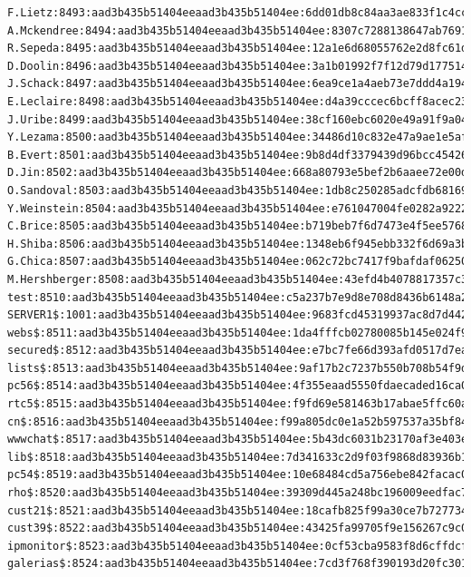 \documentclass[12pt,a4paper]{article}
\begin{document}
\begin{appendices}
\begin{lstlisting}
F.Lietz:8493:aad3b435b51404eeaad3b435b51404ee:6dd01db8c84aa3ae833f1c4cce0d7f98:::
A.Mckendree:8494:aad3b435b51404eeaad3b435b51404ee:8307c7288138647ab7691e1674819b63:::
R.Sepeda:8495:aad3b435b51404eeaad3b435b51404ee:12a1e6d68055762e2d8fc61d9215b3ee:::
D.Doolin:8496:aad3b435b51404eeaad3b435b51404ee:3a1b01992f7f12d79d1775148bac1775:::
J.Schack:8497:aad3b435b51404eeaad3b435b51404ee:6ea9ce1a4aeb73e7ddd4a194a4dbafd2:::
E.Leclaire:8498:aad3b435b51404eeaad3b435b51404ee:d4a39cccec6bcff8acec23b572a2dd9e:::
J.Uribe:8499:aad3b435b51404eeaad3b435b51404ee:38cf160ebc6020e49a91f9a0472a281a:::
Y.Lezama:8500:aad3b435b51404eeaad3b435b51404ee:34486d10c832e47a9ae1e5af73cdfc19:::
B.Evert:8501:aad3b435b51404eeaad3b435b51404ee:9b8d4df3379439d96bcc45426f70f9d2:::
D.Jin:8502:aad3b435b51404eeaad3b435b51404ee:668a80793e5bef2b6aaee72e00d59355:::
O.Sandoval:8503:aad3b435b51404eeaad3b435b51404ee:1db8c250285adcfdb68169bfacf09119:::
Y.Weinstein:8504:aad3b435b51404eeaad3b435b51404ee:e761047004fe0282a9222b27784fd8de:::
C.Brice:8505:aad3b435b51404eeaad3b435b51404ee:b719beb7f6d7473e4f5ee57687b9b7e5:::
H.Shiba:8506:aad3b435b51404eeaad3b435b51404ee:1348eb6f945ebb332f6d69a3b8f4f7c1:::
G.Chica:8507:aad3b435b51404eeaad3b435b51404ee:062c72bc7417f9bafdaf0625003435f2:::
M.Hershberger:8508:aad3b435b51404eeaad3b435b51404ee:43efd4b4078817357c3bafed63f13dd9:::
test:8510:aad3b435b51404eeaad3b435b51404ee:c5a237b7e9d8e708d8436b6148a25fa1:::
SERVER1$:1001:aad3b435b51404eeaad3b435b51404ee:9683fcd45319937ac8d7d4428e94f6d5:::
webs$:8511:aad3b435b51404eeaad3b435b51404ee:1da4fffcb02780085b145e024f93c930:::
secured$:8512:aad3b435b51404eeaad3b435b51404ee:e7bc7fe66d393afd0517d7ea0e9e6667:::
lists$:8513:aad3b435b51404eeaad3b435b51404ee:9af17b2c7237b550b708b54f9d40b8a1:::
pc56$:8514:aad3b435b51404eeaad3b435b51404ee:4f355eaad5550fdaecaded16ca0b02ea:::
rtc5$:8515:aad3b435b51404eeaad3b435b51404ee:f9fd69e581463b17abae5ffc60a2a428:::
cn$:8516:aad3b435b51404eeaad3b435b51404ee:f99a805dc0e1a52b597537a35bf84545:::
wwwchat$:8517:aad3b435b51404eeaad3b435b51404ee:5b43dc6031b23170af3e403ebe26351e:::
lib$:8518:aad3b435b51404eeaad3b435b51404ee:7d341633c2d9f03f9868d83936b174f2:::
pc54$:8519:aad3b435b51404eeaad3b435b51404ee:10e68484cd5a756ebe842facac09047e:::
rho$:8520:aad3b435b51404eeaad3b435b51404ee:39309d445a248bc196009eedfac78059:::
cust21$:8521:aad3b435b51404eeaad3b435b51404ee:18cafb825f99a30ce7b727734a1ec416:::
cust39$:8522:aad3b435b51404eeaad3b435b51404ee:43425fa99705f9e156267c9c0f5cef47:::
ipmonitor$:8523:aad3b435b51404eeaad3b435b51404ee:0cf53cba9583f8d6cffdcf6c276864b3:::
galerias$:8524:aad3b435b51404eeaad3b435b51404ee:7cd3f768f390193d20fc30102a886f65:::

\end{lstlisting}
\end{appendices}
\end{document}

